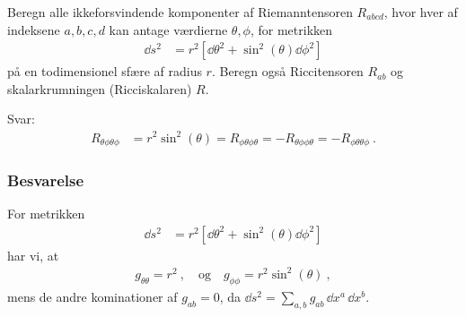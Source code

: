 \documentclass[../main.tex]{subfiles}
\begin{document}
Beregn alle ikkeforsvindende komponenter af Riemanntensoren $R_{abcd}$, hvor hver af indeksene $a,b,c,d$ kan antage værdierne $\theta,\phi$, for metrikken
\begin{align}
    \dd s^2 &= r^2 \left[ \dd \theta^2 + \sin^2(\theta) \dd \phi^2 \right]
\end{align}
på en todimensionel sfære af radius $r$. Beregn også Riccitensoren $R_{ab}$ og skalarkrumningen (Ricciskalaren) $R$.

Svar:
\begin{align}
    R_{\theta\phi\theta\phi} &= r^2 \sin^2(\theta)
        = R_{\phi\theta\phi\theta}
        = - R_{\theta\phi\phi\theta}
        = - R_{\phi\theta\theta\phi} \: .
\end{align}


\subsubsection{Besvarelse}

For metrikken
\begin{align}
    \dd s^2 &= r^2 \left[ \dd \theta^2 + \sin^2(\theta) \dd \phi^2 \right]
\end{align}
har vi, at
\begin{align}
    g_{\theta\theta} = r^2 \: , \quad \text{og} \quad
    g_{\phi\phi} = r^2 \sin^2(\theta) \: ,
\end{align}
mens de andre kominationer af $g_{ab} = 0$, da $\dd s^2 = \sum_{a,b} g_{ab}\, \dd x^a\, \dd x^b$.
\end{document}
